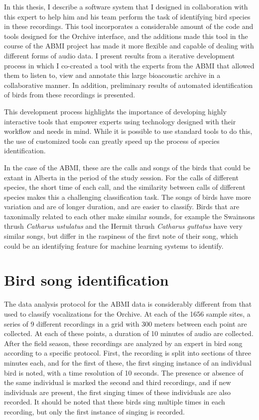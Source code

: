 \documentclass[12pt,oneside]{book}
\begin{document}
In this thesis, I describe a software system that I designed in
collaboration with this expert to help him and his team perform the
task of identifying bird species in these recordings.  This tool
incorporates a considerable amount of the code and tools designed for
the Orchive interface, and the additions made this tool in the course
of the ABMI project has made it more flexible and capable of dealing
with different forms of audio data.  I present results from a
iterative development process in which I co-created a tool with the
experts from the ABMI that allowed them to listen to, view and
annotate this large bioacoustic archive in a collaborative manner.  In
addition, preliminary results of automated identification of birds
from these recordings is presented.

This development process highlights the importance of developing
highly interactive tools that empower experts using technology
designed with their workflow and needs in mind.  While it is possible
to use standard tools to do this, the use of customized tools can
greatly speed up the process of species identification. 

In the case of the ABMI, these are the calls and songs of the birds
that could be extant in Alberta in the period of the study session.
For the calls of different species, the short time of each call, and
the similarity between calls of different species makes this a
challenging classification task.  The songs of birds have more
variation and are of longer duration, and are easier to classify.
Birds that are taxonimally related to each other make similar sounds,
for example the Swainsons thrush \textit{Catharus ustulatus} and the
Hermit thrush \textit{Catharus guttatus} have very similar songs, but
differ in the raspiness of the first note of their song, which could
be an identifying feature for machine learning systems to identify.


\section{Bird song identification}

The data analysis protocol for the ABMI data is considerably different
from that used to classify vocalizations for the Orchive.  At each of
the 1656 sample sites, a series of 9 different recordings in a grid
with 300 meters between each point are collected.  At each of these
points, a duration of 10 minutes of audio are collected.  After the
field season, these recordings are analyzed by an expert in bird song
according to a specific protocol.  First, the recording is split into
sections of three minutes each, and for the first of these, the first
singing instance of an individual bird is noted, with a time
resolution of 10 seconds.  The presence or absence of the same
individual is marked the second and third recordings, and if new
individuals are present, the first singing times of these individuals
are also recorded.  It should be noted that these birds sing multiple
times in each recording, but only the first instance of singing is
recorded.
\end{document}

